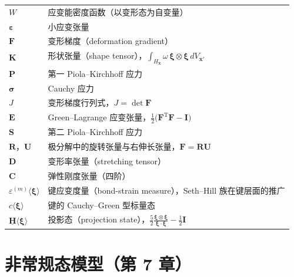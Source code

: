 \begin{longtable}{@{}p{4.8cm}>{\raggedright\arraybackslash}p{10.2cm}@{}}
  $W$ & 应变能密度函数（以变形态为自变量） \\
  $\boldsymbol{\varepsilon}$ & 小应变张量 \\
  $\mathbf{F}$ & 变形梯度（deformation gradient） \\
  $\mathbf{K}$ & 形状张量（shape tensor），$\displaystyle\int_{H_{\mathbf{x}}}\omega\,\boldsymbol{\xi}\otimes\boldsymbol{\xi}\,dV_{\mathbf{x}'}$ \\
  $\mathbf{P}$ & 第一 Piola–Kirchhoff 应力 \\
  $\boldsymbol{\sigma}$ & Cauchy 应力 \\
  $J$ & 变形梯度行列式，$J=\det\mathbf{F}$ \\
  $\mathbf{E}$ & Green–Lagrange 应变张量，$\frac{1}{2}\bigl(\mathbf{F}^{\mathrm{T}}\mathbf{F}-\mathbf{I}\bigr)$ \\
  $\mathbf{S}$ & 第二 Piola–Kirchhoff 应力 \\
  $\mathbf{R}$，$\mathbf{U}$ & 极分解中的旋转张量与右伸长张量，$\mathbf{F}=\mathbf{R}\mathbf{U}$ \\
  $\mathbf{D}$ & 变形率张量（stretching tensor） \\
  $\mathbf{C}$ & 弹性刚度张量（四阶） \\
  $\varepsilon^{(m)}\langle\boldsymbol{\xi}\rangle$ & 键应变度量（bond-strain measure），Seth–Hill 族在键层面的推广 \\
  $c\langle\boldsymbol{\xi}\rangle$ & 键的 Cauchy–Green 型标量态 \\
  $\underline{\mathbf{H}}\langle\boldsymbol{\xi}\rangle$ & 投影态（projection state），$\frac{5}{2}\frac{\boldsymbol{\xi}\otimes\boldsymbol{\xi}}{\boldsymbol{\xi}\cdot\boldsymbol{\xi}}-\frac{1}{2}\mathbf{I}$ \\
\end{longtable}

\section*{非常规态模型（第 7 章）}


